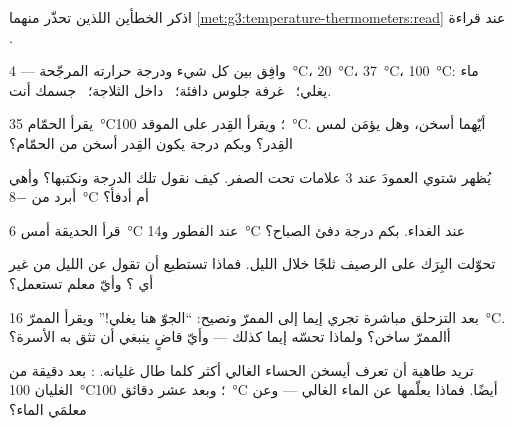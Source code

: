 \begin{exercise}[$\star$]\label{exo:g3:temperature-thermometers:4}
اذكر الخطأين اللذين تحذّر منهما
\cref{met:g3:temperature-thermometers:read} عند قراءة .
\end{exercise}

\begin{exercise}[$\star$]\label{exo:g3:temperature-thermometers:5}
وافِق بين كل شيء ودرجة حرارته المرجّحة ---
\qty{4}{\celsius}، \qty{20}{\celsius}، \qty{37}{\celsius}،
\qty{100}{\celsius}: ماء يغلي؛ \ غرفة جلوس دافئة؛ \ داخل
الثلاجة؛ \ جسمك أنت.
\end{exercise}

\begin{exercise}[$\star$]\label{exo:g3:temperature-thermometers:6}
يقرأ  الحمّام \qty{35}{\celsius}؛ ويقرأ القِدر على
الموقد \qty{100}{\celsius}. أيّهما أسخن، وهل يؤمَن لمس القِدر؟
وبكم درجة يكون القِدر أسخن من الحمّام؟
\end{exercise}

\begin{exercise}[$\star$]\label{exo:g3:temperature-thermometers:7}
يُظهر  شتوي العمودَ عند $3$ علامات تحت الصفر. كيف
نقول تلك الدرجة ونكتبها؟ وأهي أبرد من \qty{-8}{\celsius} أم
أدفأ؟
\end{exercise}

\begin{exercise}[$\star$]\label{exo:g3:temperature-thermometers:8}
قرأ  الحديقة أمس \qty{6}{\celsius} عند الفطور
و\qty{14}{\celsius} عند الغداء. بكم درجة دفئ الصباح؟
\end{exercise}

\begin{exercise}[$\star$]\label{exo:g3:temperature-thermometers:9}
تحوّلت البِرَك على الرصيف ثلجًا خلال الليل. فماذا تستطيع أن تقول
عن  الليل من غير أي ؟ وأيّ معلم تستعمل؟
\end{exercise}

\begin{exercise}[$\star\star$]\label{exo:g3:temperature-thermometers:10}
بعد التزحلق مباشرة تجري إيما إلى الممرّ وتصيح: ``الجوّ هنا يغلي!''
ويقرأ  الممرّ \qty{16}{\celsius}. أالممرّ ساخن؟ ولماذا
تحسّه إيما كذلك --- وأيّ قاضٍ ينبغي أن تثق به الأسرة؟
\end{exercise}

\begin{exercise}[$\star\star$]\label{exo:g3:temperature-thermometers:11}
تريد طاهية أن تعرف أيسخن الحساء الغالي أكثر كلما طال غليانه.
: بعد دقيقة من الغليان \qty{100}{\celsius}؛ وبعد عشر دقائق
\qty{100}{\celsius} أيضًا. فماذا يعلّمها  عن الماء
الغالي --- وعن معلمَي الماء؟
\end{exercise}
